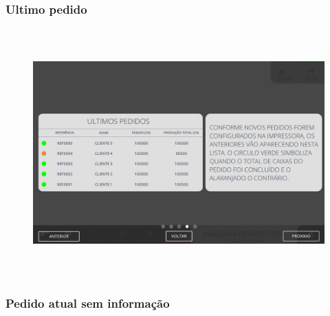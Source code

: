 \vspace*{\fill}


\newpage

\thispagestyle{fancy}

\vspace*{40 pt}

\subsubsection{\small{Ultimo pedido}}\label{telaPrincialUltimoPedido}

\vspace*{\fill}

\begin{figure}[h]
  \centering
  \includegraphics[width=576px,height=360px]{src/imagesFlexo/01-main/e-4.png}
\end{figure}

\vspace*{\fill}

\newpage

\thispagestyle{fancy}

\vspace*{40 pt}

\subsubsection{\small{Pedido atual sem informação}}\label{telaPrincialPedidoAtualSemInformacao}

\vspace*{\fill}

